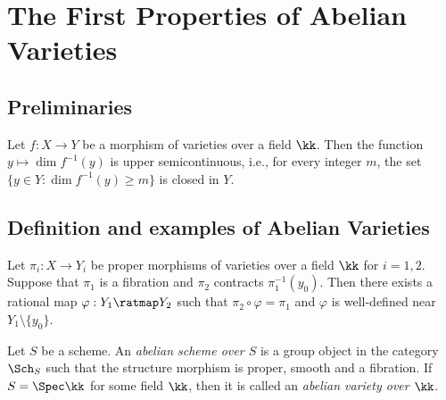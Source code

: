 \section{The First Properties of Abelian Varieties}


\subsection{Preliminaries}
    \begin{proposition}\label{prop:upper semicontinuity of fiber dimension}
        Let \(f: X \to Y\) be a morphism of varieties over a field \(\kk\).
        Then the function \(y \mapsto \dim f^{-1}(y)\) is upper semicontinuous, i.e., for every integer \(m\), the set \(\{y \in Y: \dim f^{-1}(y) \geq m\}\) is closed in \(Y\).
    \end{proposition}

    
\subsection{Definition and examples of Abelian Varieties}
    \begin{theorem}\label{thm: Rigidity Lemma}
        Let \(\pi_i: X \to Y_i\) be proper morphisms of varieties over a field \(\kk\) for \(i=1,2\).
        Suppose that \(\pi_1\) is a fibration and \(\pi_2\) contracts \(\pi_1^{-1}(y_0)\).
        Then there exists a rational map \(\varphi: Y_1 \ratmap Y_2\) such that \(\pi_2 \circ \varphi = \pi_1\) and \(\varphi\) is well-defined near \(Y_1 \setminus \{y_0\}\). 
    \end{theorem}

    \begin{definition}\label{def: abelian schemes}
        Let \(S\) be a scheme.
        An \emph{abelian scheme over \(S\)} is a group object in the category \(\Sch_S\) such that the structure morphism is proper, smooth and a fibration.
        If \(S = \Spec \kk\) for some field \(\kk\), then it is called an \emph{abelian variety over \(\kk\)}.
    \end{definition}

